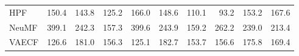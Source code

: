 \begin{tabular}{lrrrrrrrrr}
HPF                &                150.4 &                143.8 &                 125.2 &                166.0 &                148.6 &                 110.1 &                   93.2 &                  153.2 &                   167.6 \\
NeuMF              &                399.1 &                242.3 &                 157.3 &                399.6 &                243.9 &                 159.2 &                  262.2 &                  239.0 &                   213.4 \\
VAECF              &                126.6 &                181.0 &                 156.3 &                125.1 &                182.7 &                 153.7 &                  156.6 &                  175.8 &                   169.4 \\
\bottomrule
\end{tabular}

